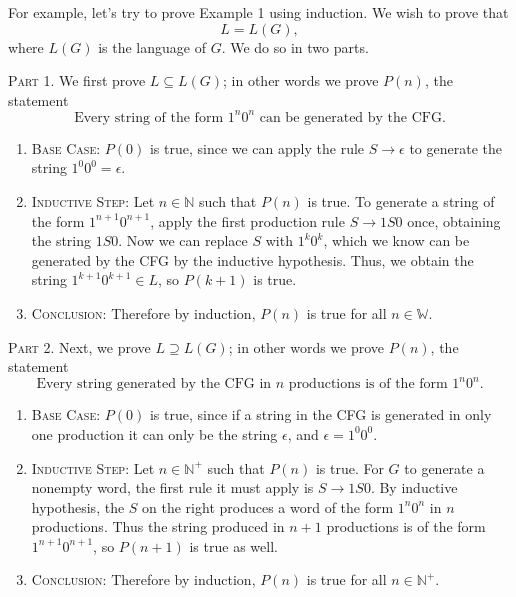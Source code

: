 \documentclass{article}
\begin{document}
    \vspace{2mm}
    For example, let's try to prove Example 1 using induction. We wish to prove that $$L = L(G),$$ where $L(G)$ is the language of $G$. We do so in two parts.

    \vspace{2mm}
    \textsc{Part 1.} We first prove $L \subseteq L(G)$; in other words we prove $P(n)$, the statement $$\text{Every string of the form $1^n0^n$ can be generated by the CFG.}$$
    \begin{enumerate} [label = {}, leftmargin = .25in]
        \item \textsc{Base Case:} $P(0)$ is true, since we can apply the rule $S \rightarrow \epsilon$ to generate the string $1^{0}0^{0} = \epsilon$.
        \item \textsc{Inductive Step:} Let $n \in \mathbb{N}$ such that $P(n)$ is true. To generate a string of the form $1^{n+1}0^{n+1}$, apply the first production rule $S \rightarrow 1S0$ once, obtaining the string $1S0$. Now we can replace $S$ with $1^{k}0^{k}$, which we know can be generated by the CFG by the inductive hypothesis. Thus, we obtain the string $1^{k+1}0^{k+1} \in L$, so $P(k + 1)$ is true.
        \item \textsc{Conclusion:} Therefore by induction, $P(n)$ is true for all $n \in \mathbb{W}$.
    \end{enumerate}
    
    \vspace{1.5mm}
    \textsc{Part 2.} Next, we prove $L \supseteq L(G)$; in other words we prove $P(n)$, the statement $$\text{Every string generated by the CFG in $n$ productions is of the form $1^{n}0^{n}$.}$$
    \begin{enumerate} [label = {}, leftmargin = .25in]
        \item \textsc{Base Case:} $P(0)$ is true, since if a string in the CFG is generated in only one production it can only be the string $\epsilon$, and $\epsilon = 1^{0}0^{0}$.
        \item \textsc{Inductive Step:} Let $n \in \mathbb{N}^{+}$ such that $P(n)$ is true. For $G$ to generate a nonempty word, the first rule it must apply is $S \rightarrow 1S0$. By inductive hypothesis, the $S$ on the right produces a word of the form $1^{n}0^{n}$ in $n$ productions. Thus the string produced in $n + 1$ productions is of the form $1^{n + 1}0^{n + 1}$, so $P(n + 1)$ is true as well.
        \item \textsc{Conclusion:} Therefore by induction, $P(n)$ is true for all $n \in \mathbb{N}^{+}$.
    \end{enumerate}
    
\end{document}
